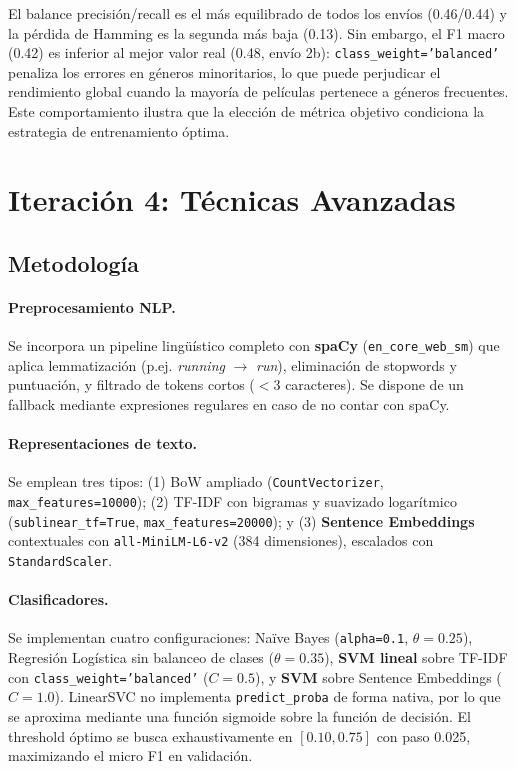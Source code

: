 \documentclass[11pt, a4paper]{article}
\begin{document}
El balance precisión/recall es el más equilibrado de todos los envíos (0.46/0.44) y la pérdida de Hamming es la segunda más baja (0.13). Sin embargo, el F1 macro (0.42) es inferior al mejor valor real (0.48, envío 2b): \texttt{class\_weight='balanced'} penaliza los errores en géneros minoritarios, lo que puede perjudicar el rendimiento global cuando la mayoría de películas pertenece a géneros frecuentes. Este comportamiento ilustra que la elección de métrica objetivo condiciona la estrategia de entrenamiento óptima.

\section{Iteración 4: Técnicas Avanzadas}

\subsection{Metodología}

\paragraph{Preprocesamiento NLP.}
Se incorpora un pipeline lingüístico completo con \textbf{spaCy} (\texttt{en\_core\_web\_sm}) que aplica lemmatización (p.ej. \textit{running} $\to$ \textit{run}), eliminación de stopwords y puntuación, y filtrado de tokens cortos ($<3$ caracteres). Se dispone de un fallback mediante expresiones regulares en caso de no contar con spaCy.

\paragraph{Representaciones de texto.}
Se emplean tres tipos: (1) BoW ampliado (\texttt{CountVectorizer}, \texttt{max\_features=10000}); (2) TF-IDF con bigramas y suavizado logarítmico (\texttt{sublinear\_tf=True}, \texttt{max\_features=20000}); y (3) \textbf{Sentence Embeddings} contextuales con \texttt{all-MiniLM-L6-v2} (384 dimensiones), escalados con \texttt{StandardScaler}.

\paragraph{Clasificadores.}
Se implementan cuatro configuraciones: Naïve Bayes (\texttt{alpha=0.1}, $\theta=0.25$), Regresión Logística sin balanceo de clases ($\theta=0.35$), \textbf{SVM lineal} sobre TF-IDF con \texttt{class\_weight='balanced'} ($C=0.5$), y \textbf{SVM} sobre Sentence Embeddings ($C=1.0$). LinearSVC no implementa \texttt{predict\_proba} de forma nativa, por lo que se aproxima mediante una función sigmoide sobre la función de decisión. El threshold óptimo se busca exhaustivamente en $[0.10, 0.75]$ con paso 0.025, maximizando el micro F1 en validación.
\end{document}
